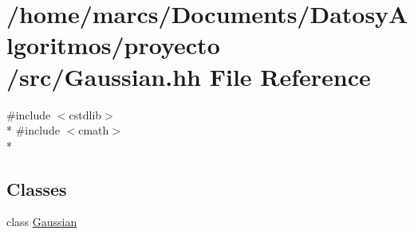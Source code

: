 \hypertarget{_gaussian_8hh}{\section{/home/marcs/\-Documents/\-Datosy\-Algoritmos/proyecto /src/\-Gaussian.hh File Reference}
\label{_gaussian_8hh}
}
{\ttfamily \#include $<$cstdlib$>$}\\*
{\ttfamily \#include $<$cmath$>$}\\*
\subsection*{Classes}
\begin{DoxyCompactItemize}
\item 
class \hyperlink{class_gaussian}{Gaussian}
\end{DoxyCompactItemize}
